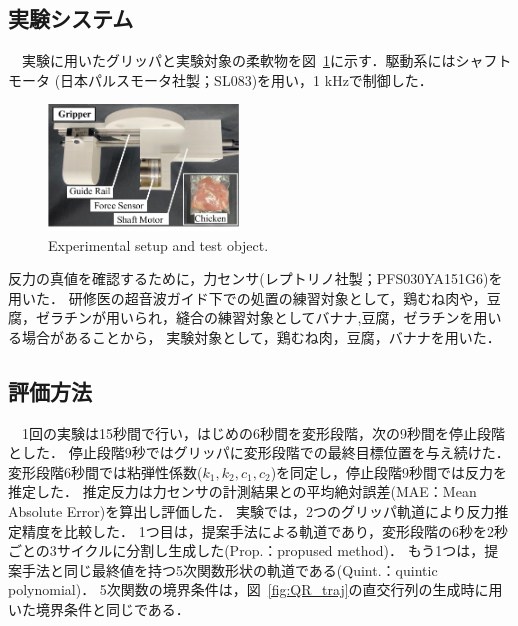 \documentclass[a4paper]{jarticle}
\begin{document}
\subsection{実験システム}
　実験に用いたグリッパと実験対象の柔軟物を図~\ref{fig:exp_setup}に示す．駆動系にはシャフトモータ (日本パルスモータ社製；SL083)を用い，1 kHzで制御した．
\begin{figure}[tb]
    \centering
    \includegraphics[width=0.45\textwidth]{exp_setup_chicken.pdf}
    \caption{Experimental setup and test object.}
    \label{fig:exp_setup}
\end{figure}
反力の真値を確認するために，力センサ(レプトリノ社製；PFS030YA151G6)を用いた．
研修医の超音波ガイド下での処置の練習対象として，鶏むね肉や，豆腐，ゼラチンが用いられ，縫合の練習対象としてバナナ,豆腐，ゼラチンを用いる場合があることから\cite{exp_ref1}\cite{exp_ref2}\cite{exp_ref3}，
実験対象として，鶏むね肉，豆腐，バナナを用いた．
\subsection{評価方法}
　1回の実験は15秒間で行い，はじめの6秒間を変形段階，次の9秒間を停止段階とした．
停止段階9秒ではグリッパに変形段階での最終目標位置を与え続けた．
変形段階6秒間では粘弾性係数($k_1, k_2, c_1, c_2$)を同定し，停止段階9秒間では反力を推定した．
推定反力は力センサの計測結果との平均絶対誤差(MAE：Mean Absolute Error)を算出し評価した．
実験では，2つのグリッパ軌道により反力推定精度を比較した．
1つ目は，提案手法による軌道であり，変形段階の6秒を2秒ごとの3サイクルに分割し生成した(Prop.：propused method)．
もう1つは，提案手法と同じ最終値を持つ5次関数形状の軌道である(Quint.：quintic polynomial)．
5次関数の境界条件は，図~{\ref{fig:QR_traj}}の直交行列の生成時に用いた境界条件と同じである．
\end{document}
